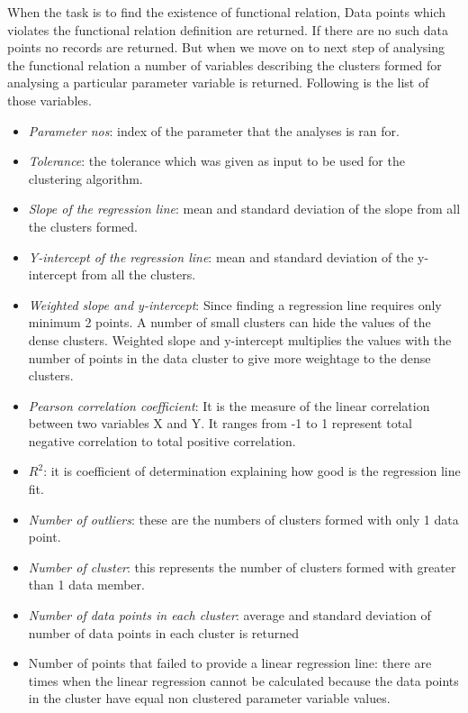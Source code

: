 When the task is to find the existence of functional relation, Data points which violates the functional relation definition are returned. If there are no such data points no records are returned. But when we move on to next step of analysing the functional relation a number of variables describing the clusters formed for analysing a particular parameter variable is returned. Following is the list of those variables.

\begin{itemize}
    \item \textit{Parameter nos}: index of the parameter that the analyses is ran for.
    \item \textit{Tolerance}: the tolerance which was given as input to be used for the clustering algorithm.
    \item \textit{Slope of the regression line}: mean and standard deviation of the slope from all the clusters formed.
    \item \textit{Y-intercept of the regression line}: mean and standard deviation of the y-intercept from all the clusters.
    \item \textit{Weighted slope and y-intercept}: Since finding a regression line requires only minimum 2 points. A number of small clusters can hide the values of the dense clusters. Weighted slope and y-intercept multiplies the values with the number of points in the data cluster to give more weightage to the dense clusters.
    \item \textit{Pearson correlation coefficient}: It is the measure of the linear correlation between two variables X and Y. It ranges from -1 to 1 represent total negative correlation to total positive correlation.
    \item \textit{\(R^2\)}: it is coefficient of determination explaining how good is the regression line fit.
    \item \textit{Number of outliers}: these are the numbers of clusters formed with only 1 data point.
    \item \textit{Number of cluster}: this represents the number of clusters formed with greater than 1 data member.
    \item \textit{Number of data points in each cluster}: average and standard deviation of number of data points in each cluster is returned
    \item Number of points that failed to provide a linear regression line: there are times when the linear regression cannot be calculated because the data points in the cluster have equal non clustered parameter variable values.

\end{itemize}

